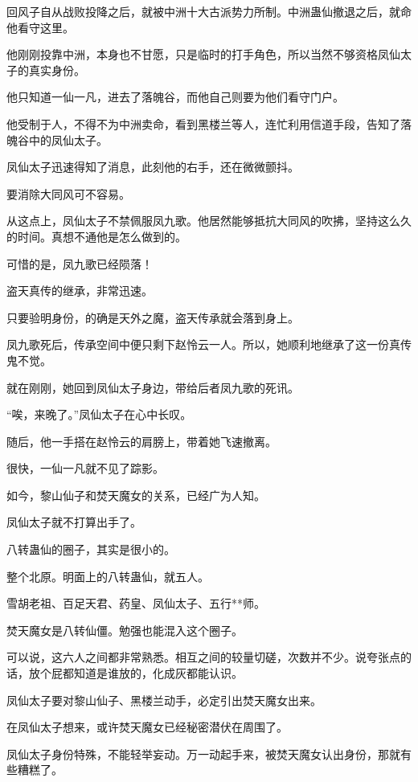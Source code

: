 
\begin{this_body}

回风子自从战败投降之后，就被中洲十大古派势力所制。中洲蛊仙撤退之后，就命他看守这里。

他刚刚投靠中洲，本身也不甘愿，只是临时的打手角色，所以当然不够资格凤仙太子的真实身份。

他只知道一仙一凡，进去了落魄谷，而他自己则要为他们看守门户。

他受制于人，不得不为中洲卖命，看到黑楼兰等人，连忙利用信道手段，告知了落魄谷中的凤仙太子。

凤仙太子迅速得知了消息，此刻他的右手，还在微微颤抖。

要消除大同风可不容易。

从这点上，凤仙太子不禁佩服凤九歌。他居然能够抵抗大同风的吹拂，坚持这么久的时间。真想不通他是怎么做到的。

可惜的是，凤九歌已经陨落！

盗天真传的继承，非常迅速。

只要验明身份，的确是天外之魔，盗天传承就会落到身上。

凤九歌死后，传承空间中便只剩下赵怜云一人。所以，她顺利地继承了这一份真传鬼不觉。

就在刚刚，她回到凤仙太子身边，带给后者凤九歌的死讯。

“唉，来晚了。”凤仙太子在心中长叹。

随后，他一手搭在赵怜云的肩膀上，带着她飞速撤离。

很快，一仙一凡就不见了踪影。

如今，黎山仙子和焚天魔女的关系，已经广为人知。

凤仙太子就不打算出手了。

八转蛊仙的圈子，其实是很小的。

整个北原。明面上的八转蛊仙，就五人。

雪胡老祖、百足天君、药皇、凤仙太子、五行**师。

焚天魔女是八转仙僵。勉强也能混入这个圈子。

可以说，这六人之间都非常熟悉。相互之间的较量切磋，次数并不少。说夸张点的话，放个屁都知道是谁放的，化成灰都能认识。

凤仙太子要对黎山仙子、黑楼兰动手，必定引出焚天魔女出来。

在凤仙太子想来，或许焚天魔女已经秘密潜伏在周围了。

凤仙太子身份特殊，不能轻举妄动。万一动起手来，被焚天魔女认出身份，那就有些糟糕了。


\end{this_body}
